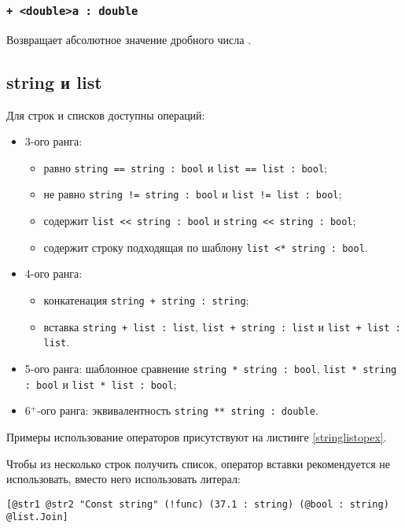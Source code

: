 \documentclass[a4paper, 14pt]{extarticle}
\newenvironment{icItems}
	{ \begin{itemize} [noitemsep,nolistsep] }
	{ \end{itemize} }
\begin{document}
\subsubsection{\lstinline`+ <double>a : double`}
	Возвращает абсолютное значение дробного числа .

\subsection{{\color{bluemarin}string} и {\color{bluemarin}list}}

	Для строк и списков доступны операций:
\begin{icItems}
	\item 3-ого ранга:
		\begin{icItems}
		\item равно \lstinline`string == string : bool` и \lstinline`list == list : bool`;
		\item не равно \lstinline`string != string : bool` и \lstinline`list != list : bool`;
		\item содержит \lstinline`list << string : bool` и \lstinline`string << string : bool`;
		\item содержит строку подходящая по шаблону \lstinline`list <* string : bool`.
		\end{icItems}
	\item 4-ого ранга:
		\begin{icItems}
		\item конкатенация \lstinline`string + string : string`;
		\item вставка \lstinline`string + list : list`, \lstinline`list + string : list` и \lstinline`list + list : list`.
		\end{icItems}
	\item 5-ого ранга: шаблонное сравнение \lstinline`string * string : bool`, \lstinline`list * string : bool` и \lstinline`list * list : bool`;
	\item 6$^+$-ого ранга: эквивалентность \lstinline`string ** string : double`.
\end{icItems}

	Примеры использование операторов присутствуют на листинге \ref{stringlistopex}.

	Чтобы из несколько строк получить список, оператор вставки рекомендуется не использовать, вместо него использовать литерал:
\begin{lstlisting}[numbers=none]
[@str1 @str2 "Const string" (!func) (37.1 : string) (@bool : string) @list.Join]
\end{lstlisting}
\end{document}
